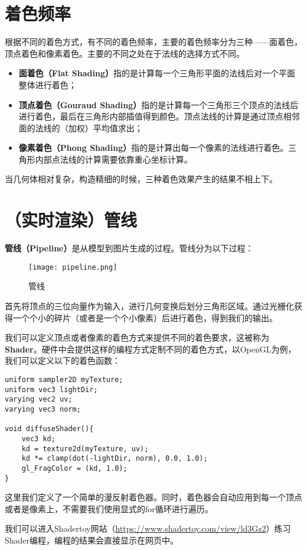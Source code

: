 \documentclass[openany]{progbookcn}
\begin{document}
\section{着色频率}
根据不同的着色方式，有不同的着色频率，主要的着色频率分为三种——面着色，顶点着色和像素着色。主要的不同之处在于法线的选择方式不同。

\begin{itemize}
	\item \textbf{面着色（Flat Shading）}指的是计算每一个三角形平面的法线后对一个平面整体进行着色；
	\item \textbf{顶点着色（Gouraud Shading）}指的是计算每一个三角形三个顶点的法线后进行着色，最后在三角形内部插值得到颜色。顶点法线的计算是通过顶点相邻面的法线的（加权）平均值求出；
	\item \textbf{像素着色（Phong Shading）}指的是计算出每一个像素的法线进行着色。三角形内部点法线的计算需要依靠重心坐标计算。
\end{itemize}
当几何体相对复杂，构造精细的时候，三种着色效果产生的结果不相上下。

\section{（实时渲染）管线}
\textbf{管线（Pipeline）}是从模型到图片生成的过程。管线分为以下过程：
\begin{figure}[H]
	\centering
	\texttt{[image: pipeline.png]}
	\caption{管线}
	\label{fig:pipeline}
\end{figure}

首先将顶点的三位向量作为输入，进行几何变换后划分三角形区域。通过光栅化获得一个个小的碎片（或者是一个个小像素）后进行着色，得到我们的输出。

我们可以定义顶点或者像素的着色方式来提供不同的着色要求，这被称为\textbf{Shader}。硬件中会提供这样的编程方式定制不同的着色方式，以OpenGL为例，我们可以定义以下的着色函数：
\begin{lstlisting}
uniform sampler2D myTexture;
uniform vec3 lightDir;
varying vec2 uv;
varying vec3 norm;

void diffuseShader(){
	vec3 kd;
	kd = texture2d(myTexture, uv);
	kd *= clamp(dot(-lightDir, norm), 0.0, 1.0);
	gl_FragColor = (kd, 1.0);
}
\end{lstlisting}
这里我们定义了一个简单的漫反射着色器。同时，着色器会自动应用到每一个顶点或者是像素上，不需要我们使用显式的for循环进行遍历。

\begin{information}
	我们可以进入Shadertoy网站（\url{https://www.shadertoy.com/view/ld3Gz2}）练习Shader编程，编程的结果会直接显示在网页中。
\end{information}
\end{document}
